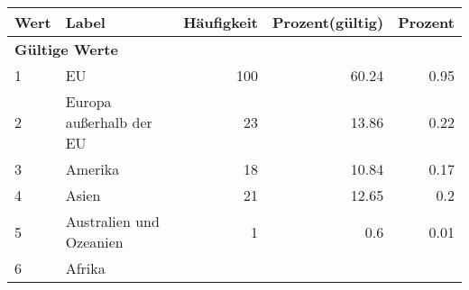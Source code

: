      \begin{longtable}{lXrrr}
     \toprule
     \textbf{Wert} & \textbf{Label} & \textbf{Häufigkeit} & \textbf{Prozent(gültig)} & \textbf{Prozent} \\
     \endhead
     \midrule
     \multicolumn{5}{l}{\textbf{Gültige Werte}}\\

     1 &
     \multicolumn{1}{X}{ EU   } &


       \num{100} &
       \num[round-mode=places,round-precision=2]{60,24} &
         \num[round-mode=places,round-precision=2]{0,95} \\

     2 &
     \multicolumn{1}{X}{ Europa außerhalb der EU   } &


       \num{23} &
       \num[round-mode=places,round-precision=2]{13,86} &
         \num[round-mode=places,round-precision=2]{0,22} \\

     3 &
     \multicolumn{1}{X}{ Amerika   } &


       \num{18} &
       \num[round-mode=places,round-precision=2]{10,84} &
         \num[round-mode=places,round-precision=2]{0,17} \\

     4 &
     \multicolumn{1}{X}{ Asien   } &


       \num{21} &
       \num[round-mode=places,round-precision=2]{12,65} &
         \num[round-mode=places,round-precision=2]{0,2} \\

     5 &
     \multicolumn{1}{X}{ Australien und Ozeanien   } &


       \num{1} &
       \num[round-mode=places,round-precision=2]{0,6} &
         \num[round-mode=places,round-precision=2]{0,01} \\

     6 &
     \multicolumn{1}{X}{ Afrika   } &



\end{longtable}
